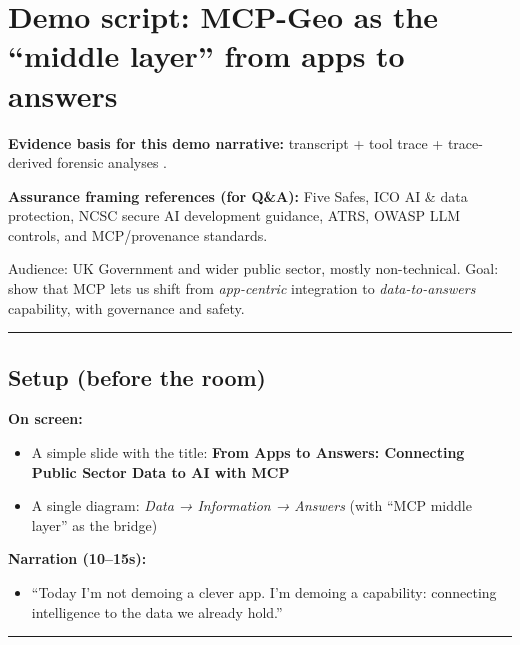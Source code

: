 \section{Demo script: MCP-Geo as the “middle layer” from apps to answers}

\textbf{Evidence basis for this demo narrative:} transcript + tool trace + trace-derived forensic analyses \cite{artefact_claude_stopped_after_ngd_features_2026_02_18,artefact_codex_trace_jsonl_2026_02_18,artefact_floor_question_analysis_2026_02_19,artefact_forensic_study_mcp_geo_2026_02_19}.

\textbf{Assurance framing references (for Q\&A):} Five Safes, ICO AI \& data protection, NCSC secure AI development guidance, ATRS, OWASP LLM controls, and MCP/provenance standards. \cite{five_safes_framework,ico_ai_data_protection,ncsc_secure_ai_guidelines,algorithmic_transparency_recording_standard,owasp_llm_top10,mcp_spec_2025_11_25,prov_o,dcat3}

Audience: UK Government and wider public sector, mostly non-technical.
Goal: show that MCP lets us shift from \textit{app-centric} integration to \textit{data-to-answers} capability, with governance and safety.

\par\medskip\hrule\medskip

\subsection{Setup (before the room)}
\textbf{On screen:}
\begin{itemize}[leftmargin=*]
\item A simple slide with the title: \textbf{From Apps to Answers: Connecting Public Sector Data to AI with MCP}
\item A single diagram: \textit{Data → Information → Answers} (with “MCP middle layer” as the bridge)
\end{itemize}

\textbf{Narration (10–15s):}
\begin{itemize}[leftmargin=*]
\item “Today I’m not demoing a clever app. I’m demoing a capability: connecting intelligence to the data we already hold.”
\end{itemize}

\par\medskip\hrule\medskip

